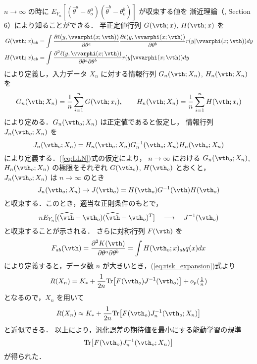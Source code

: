 \documentclass[master]{cimt}
\newcommand{\parder}[2]{\frac{\partial #1}{\partial #2}}
\newcommand{\hvth}{\widehat{{\vth}}}
\newcommand{\trace}{\text{Tr}}
\begin{document}
$n\to \infty$ の時に 
$E_{Y_n}[ (\hat{\theta}^a - \theta_o^a)
(\hat{\theta}^b - \theta_o^b) ]$ が収束する値を
漸近理論（\cite{Lehmann}, Section 6）により知ることができる．
半正定値行列 $G(\vth; x)$, $H(\vth; x)$ を
\begin{align*}
	G(\vth; x)_{ab} & = \int 
		\parder{\ell(y , \vvarphi(x;\vth))}{\theta^a}
		\parder{\ell(y , \vvarphi(x;\vth))}{\theta^b}
		r(y | \vvarphi(x ; \vth))  dy
	\nonumber \\
	H(\vth; x)_{ab} & = \int 
		\frac{\partial^2 \ell(y , \vvarphi(x; \vth))}
		{\partial \theta^a \partial \theta^b}
		r(y | \vvarphi(x ; \vth)) dy
\end{align*}
により定義し，入力データ $X_n$ に対する情報行列 $G_n(\vth;X_n)$, 
$H_n(\vth;X_n)$ を
\begin{equation}
\label{eq:def_GH}
	G_{n}(\vth;X_n) = \frac{1}{n}\sum_{i=1}^n 
		G(\vth; x_i), \qquad 
	H_{n}(\vth;X_n)  =  \frac{1}{n}\sum_{i=1}^n 
		H(\vth; x_i)
\end{equation}
により定める．$G_n(\vth_o;X_n)$ は正定値であると仮定し，
情報行列 $J_n(\vth_o; X_n)$ を
\begin{equation*}
	J_n(\vth_o; X_n) = H_n(\vth_o;X_n) G_n^{-1}(\vth_o;X_n) H_n(\vth_o;X_n)
\end{equation*}
により定義する．(\ref{eq:LLN})式の仮定により，
$n\to\infty$ における $G_n(\vth_o;X_n)$, 
$H_n(\vth_o;X_n)$ の極限をそれぞれ $G(\vth_o)$, $H(\vth_o)$ とおくと，
$J_n(\vth_o; X_n)$ は $n \to \infty$ のとき
\begin{equation*}
	 J_n(\vth_o; X_n) \to J(\vth_o) = H(\vth_o) G^{-1}(\vth)H(\vth_o)
\end{equation*}
と収束する．このとき，適当な正則条件のもとで，
\begin{equation*}
	n E_{Y_n}[ (\hvth - \vth_o)(\hvth - \vth_o)^T] 
	\quad \longrightarrow\quad J^{-1}(\vth_o)
\end{equation*}
と収束することが示される．
さらに対称行列 $F(\vth)$ を
\begin{equation*}
	F_{ab}(\vth) = \frac{\partial^2 K(\vth)}
	{\partial \theta^a \partial \theta^b} = \int H(\vth_o; x)_{ab}
	 q(x)dx
\end{equation*}
により定義すると，データ数 $n$ が大きいとき，(\ref{eq:risk_expansion})式より
\begin{equation*}
	R(X_n) = K_* + \frac{1}{2n} \trace \bigl[ F(\vth_o) J^{-1}
	(\vth_o) \bigr] + o_p(\tfrac{1}{n})
\end{equation*}
となるので，$X_n$ を用いて
\begin{equation}
\label{eq:risk_approx}
R(X_n) \approx K_* + \frac{1}{2n} \trace \bigl[ F(\vth_o) J_n^{-1}
	(\vth_o; X_n) \bigr] 
\end{equation}
と近似できる．
以上により，汎化誤差の期待値を最小にする能動学習の規準
\begin{equation}
\label{eq:Tr_crit}
	\trace \bigl[ F(\vth_o) J_n^{-1}(\vth_o; X_n) \bigr] 
\end{equation}
が得られた．
\end{document}
